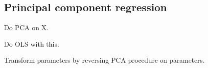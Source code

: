 
\subsection{Principal component regression}

Do PCA on X.

Do OLS with this.

Transform parameters by reversing PCA procedure on parameters.

